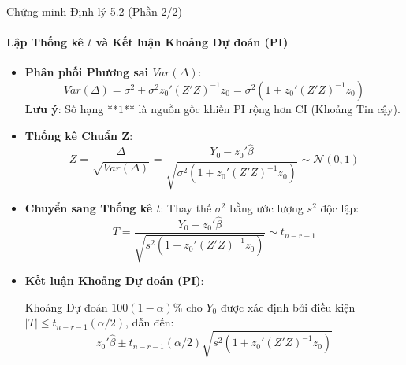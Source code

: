 \begin{frame}{Chứng minh Định lý 5.2 (Phần 2/2)}
    \framesubtitle{Lập Thống kê $t$ và Kết luận Khoảng Dự đoán (PI)}

    \begin{itemize}
        \item \textbf{Phân phối Phương sai $Var(\Delta)$}:
        \[
            Var(\Delta) = \sigma^2 + \sigma^2 z_0'(Z'Z)^{-1}z_0 = \sigma^2 \left( 1 + z_0'(Z'Z)^{-1}z_0 \right)
        \]
        \textbf{Lưu ý}: Số hạng **$1$** là nguồn gốc khiến PI rộng hơn CI (Khoảng Tin cậy).
        \item \textbf{Thống kê Chuẩn Z}:
        \[
            Z = \frac{\Delta}{\sqrt{Var(\Delta)}} = \frac{Y_0 - z_0'\hat{\beta}}{\sqrt{\sigma^2(1 + z_0'(Z'Z)^{-1}z_0)}} \sim \mathcal{N}(0, 1)
        \]

        \item \textbf{Chuyển sang Thống kê $t$}: Thay thế $\sigma^2$ bằng ước lượng $s^2$ độc lập:
        \[
            T = \frac{Y_0 - z_0'\hat{\beta}}{\sqrt{s^2(1 + z_0'(Z'Z)^{-1}z_0)}} \sim t_{n-r-1}
        \]
 
        \item \textbf{Kết luận Khoảng Dự đoán (PI)}:
        
        Khoảng Dự đoán $100(1-\alpha)\%$ cho $Y_0$ được xác định bởi điều kiện $|T| \le t_{n-r-1}(\alpha/2)$, dẫn đến:
        \[
            z_0'\hat{\beta} \pm t_{n-r-1}(\alpha/2)\sqrt{s^2(1 + z_0'(Z'Z)^{-1}z_0)}
        \]
    \end{itemize}
\end{frame}
